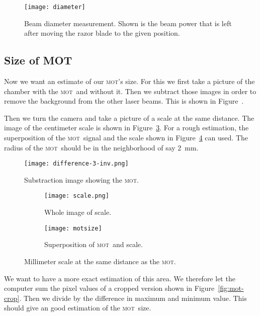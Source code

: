 \documentclass[11pt, english, fleqn, DIV=15, headinclude, BCOR=2cm]{scrreprt}
\newcommand\mot{\textsc{mot}}
\begin{document}
\begin{figure}
    \centering
    \texttt{[image: diameter]}
    \caption{%
        Beam diameter measurement. Shown is the beam power that is left after
        moving the razor blade to the given position.
    }
    \label{fig:diameter}
\end{figure}


\subsection{Size of MOT}

Now we want an estimate of our \mot's size. For this we first take a picture of
the chamber with the \mot\ and without it. Then we subtract those images in
order to remove the background from the other laser beams. This is shown in
Figure~\label{fig:difference-3-inv}.

Then we turn the camera and take a picture of a scale at the same distance. The
image of the centimeter scale is shown in Figure~\ref{fig:scale}. For a rough
estimation, the superposition of the \mot\ signal and the scale shown in
Figure~\ref{fig:motsize} can used. The radius of the \mot\ should be in the
neighborhood of say \SI{2}{\milli\meter}.

\begin{figure}
    \centering
    \texttt{[image: difference-3-inv.png]}
    \caption{Substraction image showing the \mot.}
    \label{fig:difference-3-inv}
\end{figure}

\begin{figure}
    \begin{subfigure}{.45\textwidth}
        \centering
        \texttt{[image: scale.png]}
        \caption{Whole image of scale.}
        \label{fig:scale}
    \end{subfigure}
    \hfill
    \begin{subfigure}{.45\textwidth}
        \centering
        \texttt{[image: motsize]}
        \caption{Superposition of \mot\ and scale.}
        \label{fig:motsize}
    \end{subfigure}
    \caption{Millimeter scale at the same distance as the \mot.}
    \label{fig:mot_size}
\end{figure}

We want to have a more exact estimation of this area. We therefore let the
computer sum the pixel values of a cropped version shown in
Figure~\ref{fig:mot-crop}. Then we divide by the difference in maximum and
minimum value. This should give an good estimation of the \mot\ size.
\end{document}
